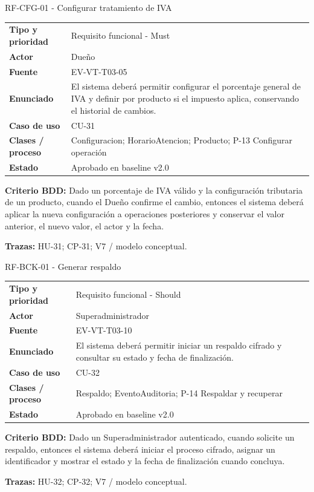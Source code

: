 \begin{reqbox}{RF-CFG-01 - Configurar tratamiento de IVA}
\begin{tabularx}{\textwidth}{>{\bfseries}p{3.2cm}Y}
Tipo y prioridad & Requisito funcional - Must \\
Actor & Dueño \\
Fuente & EV-VT-T03-05 \\
Enunciado & El sistema deberá permitir configurar el porcentaje general de IVA y definir por producto si el impuesto aplica, conservando el historial de cambios. \\
Caso de uso & CU-31 \\
Clases / proceso & Configuracion; HorarioAtencion; Producto; P-13 Configurar operación \\
Estado & Aprobado en baseline v2.0 \\
\end{tabularx}
\textbf{Criterio BDD:} Dado un porcentaje de IVA válido y la configuración tributaria de un producto, cuando el Dueño confirme el cambio, entonces el sistema deberá aplicar la nueva configuración a operaciones posteriores y conservar el valor anterior, el nuevo valor, el actor y la fecha.

\textbf{Trazas:} HU-31; CP-31; V7 / modelo conceptual.
\end{reqbox}


\begin{reqbox}{RF-BCK-01 - Generar respaldo}
\begin{tabularx}{\textwidth}{>{\bfseries}p{3.2cm}Y}
Tipo y prioridad & Requisito funcional - Should \\
Actor & Superadministrador \\
Fuente & EV-VT-T03-10 \\
Enunciado & El sistema deberá permitir iniciar un respaldo cifrado y consultar su estado y fecha de finalización. \\
Caso de uso & CU-32 \\
Clases / proceso & Respaldo; EventoAuditoria; P-14 Respaldar y recuperar \\
Estado & Aprobado en baseline v2.0 \\
\end{tabularx}
\textbf{Criterio BDD:} Dado un Superadministrador autenticado, cuando solicite un respaldo, entonces el sistema deberá iniciar el proceso cifrado, asignar un identificador y mostrar el estado y la fecha de finalización cuando concluya.

\textbf{Trazas:} HU-32; CP-32; V7 / modelo conceptual.
\end{reqbox}


